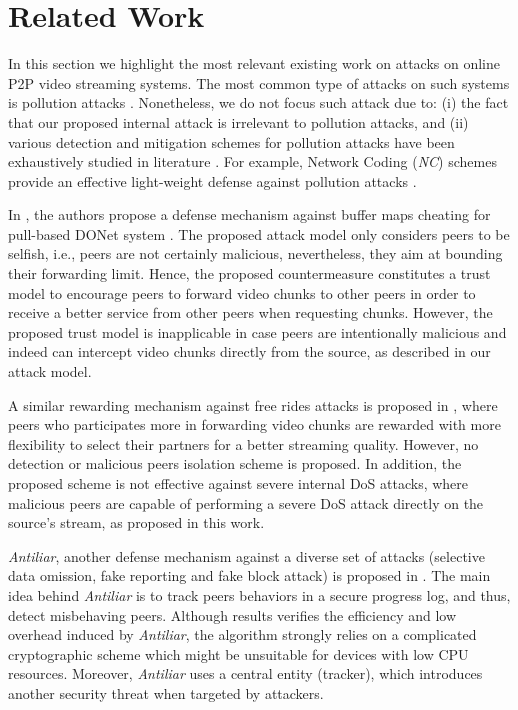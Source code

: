 \section{Related Work}
\label{sec:related}

In this section we highlight the most relevant existing work on attacks on online P2P video streaming systems.
The most common type of attacks on such systems is pollution attacks \cite{pollution1}. 
Nonetheless, we do not focus such attack due to: (i) the fact that our proposed internal attack is irrelevant to pollution attacks, and (ii) various detection and mitigation schemes for pollution attacks have been exhaustively studied in literature \cite{pollution2}.
For example, Network Coding (\textit{NC}) schemes provide an effective light-weight defense against pollution attacks \cite{nc}.

In \cite{defending}, the authors propose a defense mechanism against buffer maps cheating for pull-based DONet system \cite{zhang2005coolstreaming}.
The proposed attack model only considers peers to be selfish, i.e., peers are not certainly malicious, nevertheless, they aim at bounding their forwarding limit.
Hence, the proposed countermeasure constitutes a trust model to encourage peers to forward video chunks to other peers in order to receive a better service from other peers when requesting chunks.
However, the proposed trust model is inapplicable in case peers are intentionally malicious and indeed can intercept video chunks directly from the source, as described in our attack model.

A similar rewarding mechanism against free rides attacks is proposed in \cite{defending2}, where peers who participates more in forwarding video chunks are rewarded with more flexibility to select their partners for a better streaming quality.
However, no detection or malicious peers isolation scheme is proposed. 
In addition, the proposed scheme is not effective against severe internal DoS attacks, where malicious peers are capable of performing a severe DoS attack directly on the source's stream, as proposed in this work.

\textit{Antiliar}, another defense mechanism against a diverse set of attacks (selective data omission, fake reporting and fake block attack) is proposed in \cite{antiliar}.
The main idea behind \textit{Antiliar} is to track peers behaviors in a secure progress log, and thus, detect misbehaving peers.
Although results verifies the efficiency and low overhead induced by \textit{Antiliar}, the algorithm strongly relies on a complicated cryptographic scheme which might be unsuitable for devices with low CPU resources.
Moreover, \textit{Antiliar} uses a central entity (tracker), which introduces another security threat when targeted by attackers.

